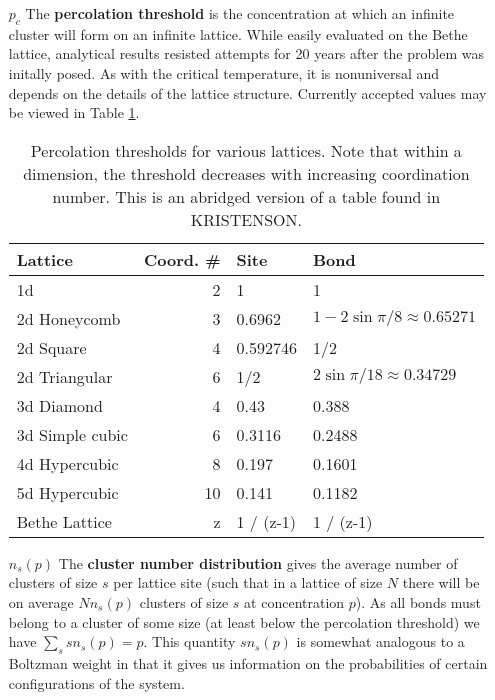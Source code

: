 \begin{enumerate}

\item[$p_c$] The \textbf{percolation threshold} is the concentration at which an infinite cluster
will form on an infinite lattice.  While easily evaluated on the Bethe lattice, analytical
results resisted attempts for 20 years after the problem was initally posed.  As with
the critical temperature, it is nonuniversal and depends on the details of the lattice
structure.  Currently accepted values may be viewed in Table \ref{tab:perc_thresh}.

\begin{table}
  \centering
  \begin{tabular}{ | l | r | l | l | }
    \hline
    Lattice & Coord. \# & Site & Bond \\
    \hline \hline
    1d & 2 & 1 & 1 \\ \hline
    2d Honeycomb & 3 & 0.6962 & $1-2\sin{\pi/8}\approx 0.65271$ \\ \hline
    2d Square & 4 & 0.592746 & 1/2 \\ \hline
    2d Triangular & 6 & 1/2 & $2\sin{\pi/18}\approx 0.34729$ \\ \hline
    3d Diamond & 4 & 0.43 & 0.388 \\ \hline
    3d Simple cubic & 6 & 0.3116 & 0.2488 \\ \hline
    4d Hypercubic & 8 & 0.197 & 0.1601 \\ \hline
    5d Hypercubic & 10 & 0.141 & 0.1182 \\ \hline
    Bethe Lattice & z & 1 / (z-1) & 1 / (z-1) \\ \hline
  \end{tabular}
  \caption{Percolation thresholds for various lattices.  Note that within a dimension,
           the threshold decreases with increasing coordination number.  This is an
           abridged version of a table found in KRISTENSON.}
  \label{tab:perc_thresh}
\end{table}

\item[$n_s(p)$] The \textbf{cluster number distribution} gives the average number of
clusters of size $s$ per lattice site (such that in a lattice of size $N$ there will be on
average $Nn_s(p)$ clusters of size $s$ at concentration $p$).  As all bonds must belong
to a cluster of some size (at least below the percolation threshold) we have
\(\sum_s sn_s(p) = p\). This quantity $sn_s(p)$ is somewhat
analogous to a Boltzman weight in that it gives us information on the probabilities of
certain configurations of the system.


\end{enumerate}
